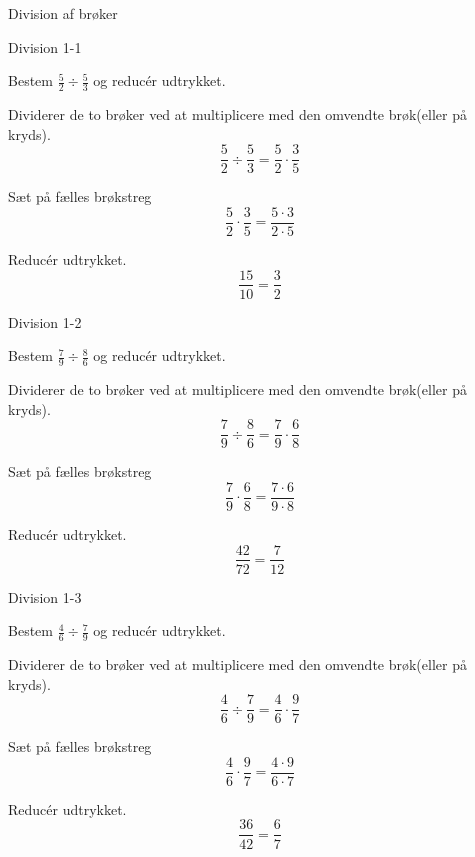 \documentclass{article}
\begin{document}
Division af brøker
\tableofcontents
\newpage

\begin{exercise}{Division 1-1}

Bestem $\frac{5}{2} \div \frac{5}{3}$ og reducér udtrykket.


\hint

Dividerer de to brøker ved at multiplicere med den omvendte brøk(eller på kryds).
\[
\frac{5}{2} \div \frac{5}{3} = \frac{5}{2} \cdot \frac{3}{5}
\]

\hint

Sæt på fælles brøkstreg
\[
 \frac{5}{2} \cdot \frac{3}{5} = \frac{5 \cdot 3}{2 \cdot 5}
\]

\hint

Reducér udtrykket.
\[
\frac{15}{10} = \frac{3}{2} 
\]

\end{exercise}

\newpage

\begin{exercise}{Division 1-2}
	
	Bestem $\frac{7}{9} \div \frac{8}{6}$ og reducér udtrykket.
	
	
	\hint
	
	Dividerer de to brøker ved at multiplicere med den omvendte brøk(eller på kryds).
	\[
	\frac{7}{9} \div \frac{8}{6} = \frac{7}{9} \cdot \frac{6}{8}
	\]
	
	\hint
	
	Sæt på fælles brøkstreg
	\[
	\frac{7}{9} \cdot \frac{6}{8} = \frac{7 \cdot 6}{9 \cdot 8}
	\]
	
	\hint
	
	Reducér udtrykket.
	\[
	\frac{42}{72} = \frac{7}{12} 
	\]
	
\end{exercise}

\newpage

\begin{exercise}{Division 1-3}
	
	Bestem $\frac{4}{6} \div \frac{7}{9}$ og reducér udtrykket.
	
	
	\hint
	
	Dividerer de to brøker ved at multiplicere med den omvendte brøk(eller på kryds).
	\[
	\frac{4}{6} \div \frac{7}{9} = \frac{4}{6} \cdot \frac{9}{7}
	\]
	
	\hint
	
	Sæt på fælles brøkstreg
	\[
	\frac{4}{6} \cdot \frac{9}{7} = \frac{4 \cdot 9}{6 \cdot 7}
	\]
	
	\hint
	
	Reducér udtrykket.
	\[
	\frac{36}{42} = \frac{6}{7} 
	\]
	
\end{exercise}
\end{document}
